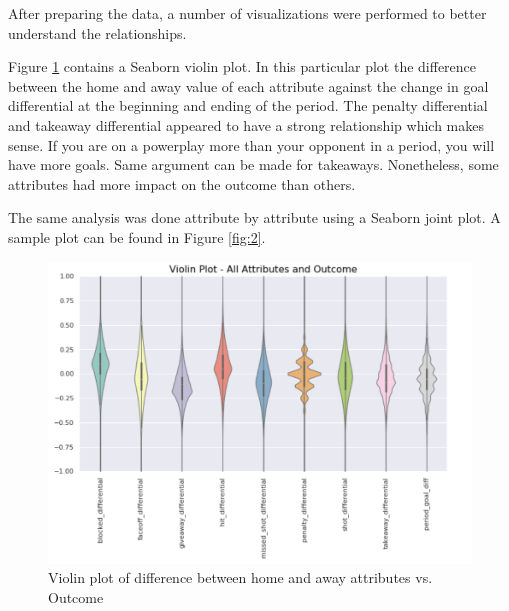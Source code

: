 \documentclass[twocolumn,letterpaper,12pt,notitlepage]{article}
\begin{document}
After preparing the data, a number of visualizations were performed to better understand the relationships. 

Figure \ref{fig:1} contains a Seaborn violin plot. In this particular plot the difference between the home and away value of each attribute against the change in goal differential at the beginning and ending of the period. The penalty differential and takeaway differential appeared to have a strong relationship which makes sense. If you are on a powerplay more than your opponent in a period, you will have more goals. Same argument can be made for takeaways. Nonetheless, some attributes had more impact on the outcome than others.

The same analysis was done attribute by attribute using a Seaborn joint plot. A sample plot can be found in Figure \ref{fig:2}.

\begin{figure}[htp]
\centering
\includegraphics[width=\linewidth]{violin}
\caption{Violin plot of difference between home and away attributes vs. Outcome}
\label{fig:1}
\end{figure}
\end{document}

